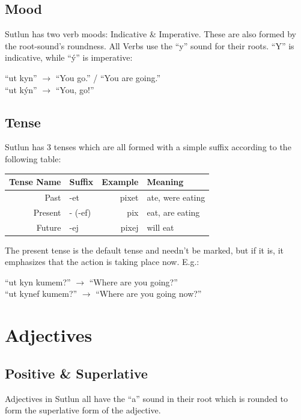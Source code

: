 \documentclass{book}
\begin{document}
\subsection{Mood}
Sutlun has two verb moods: Indicative \& Imperative. These are also formed by the root-sound's roundness.
All Verbs use the ``y'' sound for their roots. ``Y'' is indicative, while ``ý'' is imperative:

\begin{center}
    ``ut kyn'' $\rightarrow$ ``You go.'' / ``You are going.'' \\
    ``ut kýn'' $\rightarrow$ ``You, go!''
\end{center}

\subsection{Tense}
Sutlun has 3 tenses which are all formed with a simple suffix according to the following table:

\begin{center}
    \begin{tabular}{|r|l|r|l|}
        \hline
        Tense Name  & Suffix    & Example   & Meaning \\
        \hline
        Past        & -et       & pixet     & ate, were eating \\
        Present     & - (-ef)   & pix       & eat, are eating \\
        Future      & -ej       & pixej     & will eat \\
        \hline
    \end{tabular}
\end{center}
The present tense is the default tense and needn't be marked, but if it is, it emphasizes that
the action is taking place now. E.g.:

\begin{center}
    ``ut kyn kumem?'' $\rightarrow$ ``Where are you going?'' \\
    ``ut kynef kumem?'' $\rightarrow$ ``Where are you going now?''
\end{center}


\section{Adjectives}
\subsection{Positive \& Superlative}
Adjectives in Sutlun all have the ``a'' sound in their root which is rounded to form the superlative
form of the adjective.
\end{document}
